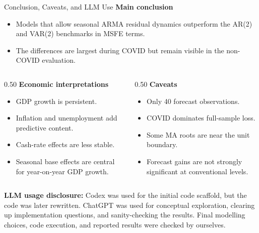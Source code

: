 \documentclass[aspectratio=169,10pt]{beamer}
\begin{document}
\begin{frame}{Conclusion, Caveats, and LLM Use}
\textbf{Main conclusion}
\begin{itemize}
    \item Models that allow seasonal ARMA residual dynamics outperform the AR(2) and VAR(2) benchmarks in MSFE terms.
    \item The differences are largest during COVID but remain visible in the non-COVID evaluation.
\end{itemize}

\begin{columns}[T,onlytextwidth]
\begin{column}{0.50\textwidth}
\textbf{Economic interpretations}
\begin{itemize}
    \item GDP growth is persistent.
    \item Inflation and unemployment add predictive content.
    \item Cash-rate effects are less stable.
    \item Seasonal base effects are central for year-on-year GDP growth.
\end{itemize}
\end{column}
\begin{column}{0.50\textwidth}
\textbf{Caveats}
\begin{itemize}
    \item Only 40 forecast observations.
    \item COVID dominates full-sample loss.
    \item Some MA roots are near the unit boundary.
    \item Forecast gains are not strongly significant at conventional levels.
\end{itemize}
\end{column}
\end{columns}

\vfill
\scriptsize\textbf{LLM usage disclosure:} Codex was used for the initial code scaffold, but the code was later rewritten. ChatGPT was used for conceptual exploration, clearing up implementation questions, and sanity-checking the results. Final modelling choices, code execution, and reported results were checked by ourselves.
\end{frame}
\end{document}
